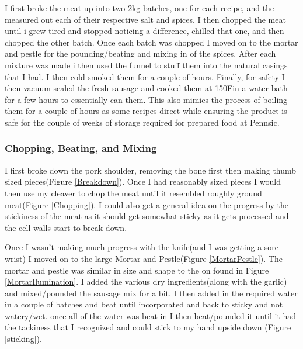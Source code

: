 \documentclass[letterpaper,11pt,leqno]{article}
\begin{document}
I first broke the meat up into two 2kg batches, one for each recipe, and the measured out each of their respective salt and spices. I then chopped the meat until i grew tired and stopped noticing a difference, chilled that one, and then chopped the other batch. Once each batch was chopped I moved on to the mortar and pestle for the pounding/beating and mixing in of the spices. After each mixture was made i then used the funnel to stuff them into the natural casings that I had. I then cold smoked them for a couple of hours. Finally, for safety I then vacuum sealed the fresh sausage and cooked them at 150F\textdegree in a water bath for a few hours to essentially can them. This also mimics the process of boiling them for a couple of hours as some recipes direct while ensuring the product is safe for the couple of weeks of storage required for prepared food at Pennsic.


\subsubsection{Chopping, Beating, and Mixing}

I first broke down the pork shoulder, removing the bone first then making thumb sized pieces(Figure \ref{Breakdown}). Once I had reasonably sized pieces I would then use my cleaver to chop the meat until it resembled roughly ground meat(Figure \ref{Chopping}). I could also get a general idea on the progress by the stickiness of the meat as it should get somewhat sticky as it gets processed and the cell walls start to break down. 

Once I wasn't making much progress with the knife(and I was getting a sore wrist) I moved on to the large Mortar and Pestle(Figure \ref{MortarPestle}). The mortar and pestle was similar in size and shape to the on found in Figure \ref{MortarIlumination}. I added the various dry ingredients(along with the garlic) and mixed/pounded the sausage mix for a bit. I then added in the required water in a couple of batches and beat until incorporated and back to sticky and not watery/wet. once all of the water was beat in I then beat/pounded it until it had the tackiness that I recognized and could stick to my hand upside down (Figure \ref{sticking}).
\end{document}
